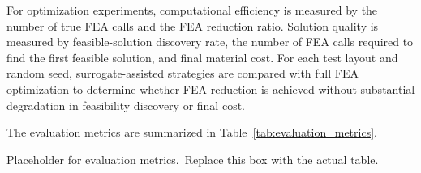 For optimization experiments, computational efficiency is measured by the number of true FEA calls and the FEA reduction ratio. Solution quality is measured by feasible-solution discovery rate, the number of FEA calls required to find the first feasible solution, and final material cost. For each test layout and random seed, surrogate-assisted strategies are compared with full FEA optimization to determine whether FEA reduction is achieved without substantial degradation in feasibility discovery or final cost.

The evaluation metrics are summarized in Table~\ref{tab:evaluation_metrics}.

\begin{table}[t]
\centering
\caption{Evaluation metrics for global surrogate models, local calibration, and optimization performance.}
\label{tab:evaluation_metrics}
\begin{minipage}[c][0.18\textheight][c]{0.92\textwidth}
\centering
Placeholder for evaluation metrics.\
Replace this box with the actual table.
\end{minipage}
\end{table}
